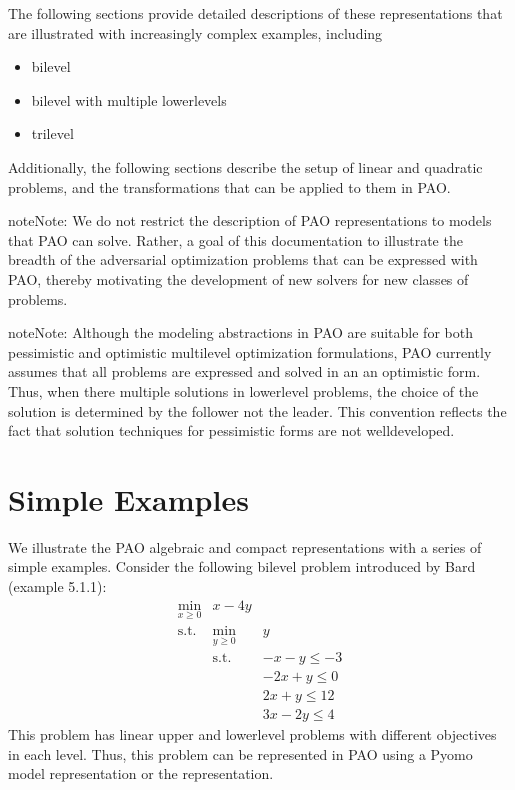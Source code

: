 \documentclass[letterpaper,10pt,english]{sphinxmanual}
\begin{document}
The following sections provide detailed descriptions of these
representations that are illustrated with increasingly complex examples,
including
\begin{itemize}
\item {} 
bilevel

\item {} 
bilevel with multiple lower\sphinxhyphen{}levels

\item {} 
trilevel

\end{itemize}

Additionally, the following sections describe the setup of linear and
quadratic problems, and the transformations that can be applied to them
in PAO.

\begin{sphinxadmonition}{note}{Note:}
We do not restrict the description of PAO representations to
models that PAO can solve. Rather, a goal of this documentation
to illustrate the breadth of the adversarial optimization problems
that can be expressed with PAO, thereby motivating the development
of new solvers for new classes of problems.
\end{sphinxadmonition}

\begin{sphinxadmonition}{note}{Note:}
Although the modeling abstractions in PAO are suitable for both
pessimistic and optimistic multilevel optimization formulations,
PAO currently assumes that all problems are expressed and solved
in an an optimistic form.  Thus, when there multiple solutions in
lower\sphinxhyphen{}level problems, the choice of the solution is determined by
the follower not the leader.  This convention reflects the fact that
solution techniques for pessimistic forms are not well\sphinxhyphen{}developed.
\end{sphinxadmonition}


\section{Simple Examples}
\label{\detokenize{examples:simple-examples}}\label{\detokenize{examples::doc}}
We illustrate the PAO algebraic and compact representations with a series
of simple examples.  Consider the following bilevel problem introduced
by Bard  (example 5.1.1):
 \begin{equation*}
 \begin{array}{lll}
 \min_{x \geq 0} & x - 4 y & \\
 \textrm{s.t.} & \min_{y \geq 0} & y\\
 & \textrm{s.t.} & -x -y \leq -3\\
 & & -2 x + y \leq 0\\
 & & 2 x + y \leq 12\\
 & & 3 x - 2 y \leq 4
 \end{array}
 \end{equation*}
This problem has linear upper\sphinxhyphen{} and lower\sphinxhyphen{}level problems with different
objectives in each level.  Thus, this problem can be represented in
PAO using a Pyomo model representation or the 
representation.
\end{document}
